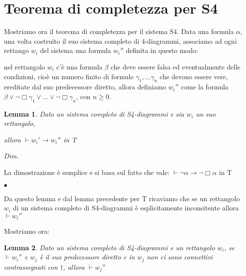 \documentclass[a4paper, titlepage, 12pt]{report}
\newtheorem{lemma}{Lemma}[chapter]
\newenvironment{proof}
    {\textit{Dim.}
    }
    {\begin{flushright}$\bullet$\end{flushright}
    }
\begin{document}
\section{Teorema di completezza per S4}
Mostriamo ora il teorema di completezza per il sistema S4.
Data una formula $\alpha$, una volta costruito il suo sistema completo di 4-diagrammi,
associamo ad ogni rettango $w_i$ del sistema una formula $w_i''$ definita in questo modo:

nel rettangolo $w_i$ c'è una formula $\beta$ che deve essere falsa ed eventualmente delle condizioni,
cioè un numero finito di formule $\gamma_1, ...\gamma_n$ che devono essere vere, ereditate
dal suo predecessore diretto, allora definiamo $w_i''$ come la formula
$\beta \lor \neg \Box \gamma_1 \lor ... \lor \neg \Box \gamma_n$, con $n \geq 0$.

\begin{lemma}
Dato un sistema completo di S4-diagrammi e sia $w_i$ un suo rettangolo,

allora $\vdash w_i' \rightarrow w_i''$ in T
\end{lemma}

\begin{proof}

La dimostrazione è semplice e si basa sul fatto che vale:
$\vdash \neg \alpha \rightarrow \neg \Box \alpha$ in T

\end{proof}

Da questo lemma e dal lemma precedente per T ricaviamo che se un rettangolo $w_i$
di un sistema completo di S4-diagrammi è esplicitamente inconsitente
allora $\vdash w_i''$

Mostriamo ora:

\begin{lemma}
Dato un sistema completo di S4-diagrammi e un rettangolo $w_i$, se $\vdash w_i''$
e $w_j$ è il suo predecessore diretto e in $w_j$ non ci sono connettivi contrassegnati
con $\dagger$,
allora $\vdash w_j''$
\end{lemma}
\end{document}
